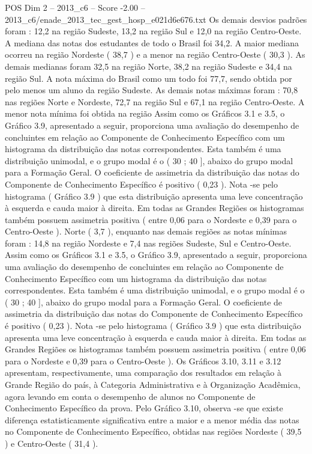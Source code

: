 \begin{textsample}{POS Dim 2 – 2013\_c6 – Score -2.00 – 2013\_c6/enade\_2013\_tec\_gest\_hosp\_e021d6e676.txt}
Os demais desvios padrões foram : 12,2 na região Sudeste, 13,2 na região Sul e 12,0 na região Centro-Oeste.
A mediana das notas dos estudantes de todo o Brasil foi 34,2.
A maior mediana ocorreu na região Nordeste ( 38,7 ) e a menor na região Centro-Oeste ( 30,3 ).
As demais medianas foram 32,5 na região Norte, 38,2 na região Sudeste e 34,4 na região Sul.
A nota máxima do Brasil como um todo foi 77,7, sendo obtida por pelo menos um aluno da região Sudeste.
As demais notas máximas foram : 70,8 nas regiões Norte e Nordeste, 72,7 na região Sul e 67,1 na região Centro-Oeste.
A menor nota mínima foi obtida na região Assim como os Gráficos 3.1 e 3.5, o Gráfico 3.9, apresentado a seguir, proporciona uma avaliação do desempenho de concluintes em relação ao Componente de Conhecimento Específico com um histograma da distribuição das notas correspondentes.
Esta também é uma distribuição unimodal, e o grupo modal é o ( 30 ; 40 ], abaixo do grupo modal para a Formação Geral.
O coeficiente de assimetria da distribuição das notas do Componente de Conhecimento Específico é positivo ( 0,23 ).
Nota -se pelo histograma ( Gráfico 3.9 ) que esta distribuição apresenta uma leve concentração à esquerda e cauda maior à direita.
Em todas as Grandes Regiões os histogramas também possuem assimetria positiva ( entre 0,06 para o Nordeste e 0,39 para o Centro-Oeste ).
Norte ( 3,7 ), enquanto nas demais regiões as notas mínimas foram : 14,8 na região Nordeste e 7,4 nas regiões Sudeste, Sul e Centro-Oeste.
Assim como os Gráficos 3.1 e 3.5, o Gráfico 3.9, apresentado a seguir, proporciona uma avaliação do desempenho de concluintes em relação ao Componente de Conhecimento Específico com um histograma da distribuição das notas correspondentes.
Esta também é uma distribuição unimodal, e o grupo modal é o ( 30 ; 40 ], abaixo do grupo modal para a Formação Geral.
O coeficiente de assimetria da distribuição das notas do Componente de Conhecimento Específico é positivo ( 0,23 ).
Nota -se pelo histograma ( Gráfico 3.9 ) que esta distribuição apresenta uma leve concentração à esquerda e cauda maior à direita.
Em todas as Grandes Regiões os histogramas também possuem assimetria positiva ( entre 0,06 para o Nordeste e 0,39 para o Centro-Oeste ).
Os Gráficos 3.10, 3.11 e 3.12 apresentam, respectivamente, uma comparação dos resultados em relação à Grande Região do país, à Categoria Administrativa e à Organização Acadêmica, agora levando em conta o desempenho de alunos no Componente de Conhecimento Específico da prova.
Pelo Gráfico 3.10, observa -se que existe diferença estatisticamente significativa entre a maior e a menor média das notas no Componente de Conhecimento Específico, obtidas nas regiões Nordeste ( 39,5 ) e Centro-Oeste ( 31,4 ).

\end{textsample}
